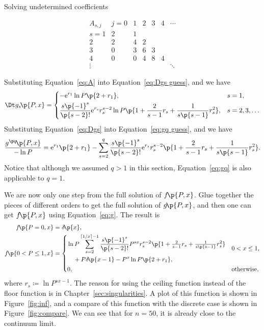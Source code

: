\documentclass[oneside,12pt,final]{ucthesis-CA2012}
\newcommand{\mrm}[1]{\mathrm{#1}}
\newcommand{\dlt}{\delta}
\newcommand{\ceq}{\coloneqq}
\newcommand{\e}{\mrm{e}}
\newcommand{\fr}{\frac}
\newcommand{\tfr}{\tfrac}
\newcommand{\fc}[2]{#1\mathchoice{\!}{\!}{}{}\p{#2}} %
\newcommand\ceil[1]{\left\lceil#1\right\rceil}
\begin{document}
\begin{mainmatter}
\begin{section}{Solving undetermined coefficients}
\begin{table}[h!]
	\caption{The first few $A_{s,j}$.}
	\label{tab:A}
	\[\begin{array}{r|cccccc}
		A_{s,j}&j=0&1&2&3&4&\cdots\\
		\hline
		s=1&2&1\\
		2&2&4&2\\
		3&0&3&6&3\\
		4&0&0&4&8&4\\
		\vdots&&&&&&\ddots
	\end{array}\]
\end{table}

Substituting Equation~\ref{eq:A} into Equation~\ref{eq:Dgs guess}, and we have
\begin{equation}
	\label{eq:Dgs}
	\fc{\Dt g_s}{P,x}=\begin{dcases}
		-\e^{r_1}\ln P\p{2+r_1},&s=1,\\
		\fr{s\p{-1}^s}{\p{s-2}!}\e^{r_s}r_s^{s-2}
		\ln P\p{1+\fr2{s-1}r_s+\fr1{s\p{s-1}}r_s^2},&s=2,3,\ldots
	\end{dcases}
\end{equation}
Substituting Equation~\ref{eq:Dgs} into Equation~\ref{eq:gq guess}, and we have
\begin{equation}
	\label{eq:gq}
	\fr{\fc{g^{\p q}}{P,x}}{-\ln P}=\e^{r_1}\p{2+r_1}
	-\sum_{s=2}^q\fr{s\p{-1}^s}{\p{s-2}!}\e^{r_s}r_s^{s-2}\p{1+\fr2{s-1}r_s+\fr1{s\p{s-1}}r_s^2}.
\end{equation}
Notice that although we assumed $q>1$ in this section,
Equation~\ref{eq:gq} is also applicable to $q=1$.

We are now only one step from the full solution of $\fc f{P,x}$.
Glue together the pieces of different orders to get the full solution of $\fc g{P,x}$,
and then one can get $\fc f{P,x}$ using Equation~\ref{eq:g}.
The result is
\begin{equation}
	\label{eq:f}
	\begin{split}
		\fc f{P=0,x}&=\fc\dlt x,\\
		\fc f{0<P\le1,x}&=\begin{dcases}
			\begin{split}
				&\ln P\sum_{s=2}^{\ceil{1/x}-1}\fr{s\p{-1}^s}{\p{s-2}!}P^{sx}r_s^{s-2}
				\p{1+\tfr2{s-1}r_s+\tfr1{s\p{s-1}}r_s^2}\\
				&\quad+P\fc\dlt{x-1}-P^x\ln P\p{2+r_1},
			\end{split}
			&0<x\le1,\\
			0,&\text{otherwise},
		\end{dcases}
	\end{split}
\end{equation}
where $r_s\ceq\ln P^{sx-1}$.
The reason for using the ceiling function instead of the floor function
is in Chapter~\ref{sec:singularities}.
A plot of this function is shown in Figure~\ref{fig:inf},
and a compare of this function with the discrete case is shown in Figure~\ref{fig:compare}.
We can see that for $n=50$, it is already close to the continuum limit.


\end{section}
\end{mainmatter}
\end{document}
